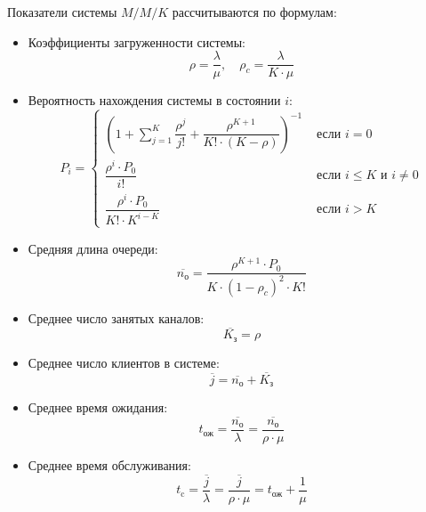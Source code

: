 \noindent Показатели системы $M/M/K$ рассчитываются по формулам:
\begin{itemize}
	\item Коэффициенты загруженности системы:
		\begin{displaymath}
			\rho = \dfrac{\lambda}{\mu}, \quad \rho_c = \dfrac{\lambda}{K \cdot \mu}
		\end{displaymath}
	\item Вероятность нахождения системы в состоянии $i$:
		\begin{displaymath}
			P_i = 
			\begin{cases}
				\left( 1 + \sum \limits_{j=1}^{K} \dfrac{\rho^j}{j!} + \dfrac{\rho^{K+1}}{K! \cdot (K - \rho)} \right)^{-1} &\text{ если } i = 0 \\[15pt]
				\dfrac{\rho^i \cdot P_0}{i!} &\text{ если } i \leq K \text{ и } i \neq 0 \\[15pt]
				\dfrac{\rho^i \cdot P_0}{K! \cdot K^{i-K}} &\text{ если } i > K
			\end{cases}
		\end{displaymath}
		
	\item Средняя длина очереди:
		\begin{displaymath}
			\overline{n_\text{о}} = \dfrac{\rho^{K+1} \cdot P_0}{K \cdot (1 - \rho_c)^2 \cdot K!}
		\end{displaymath}
		
	\item Среднее число занятых каналов:
		\begin{displaymath}
			\overline{K_\text{з}} = \rho
		\end{displaymath}
		
	\item Среднее число клиентов в системе:
		\begin{displaymath}
			\overline{j} = \overline{n_\text{о}} + \overline{K_\text{з}}
		\end{displaymath}
		
	\item Среднее время ожидания:
		\begin{displaymath}
			t_\text{ож} = \dfrac{\overline{n_\text{о}}}{\lambda} = \dfrac{\overline{n_\text{о}}}{\rho \cdot \mu}
		\end{displaymath}
		
	\item Среднее время обслуживания:
		\begin{displaymath}
			t_\text{c} = \dfrac{\overline{j}}{\lambda} = \dfrac{\overline{j}}{\rho \cdot \mu} = t_\text{ож} + \dfrac{1}{\mu}
		\end{displaymath}
\end{itemize}

